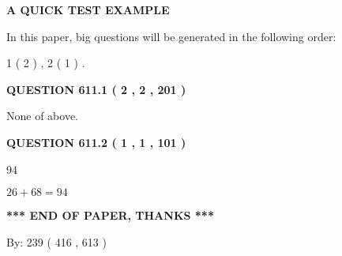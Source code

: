 \documentclass[12pt]{article}
\begin{document}
   
   
   
   
   
 \vspace{0.2in}
{\LARGE {\textbf{ A QUICK TEST EXAMPLE}}}
   
   
   
\vspace{0.2in}
   
In this paper, big questions will be generated in the following order: 
   
   
   1 ( 2 )
 ,
   2 ( 1 )
 .
  
\vspace{0.2in}
  
{\textbf{\Large{QUESTION
611.1 
 ( 2 , 2 , 201 )
}}}
  
  
 
 
\noindent{}
 
 
 None of above.
 
 
 
 
  
\vspace{0.2in}
  
{\textbf{\Large{QUESTION
611.2 
 ( 1 , 1 , 101 )
}}}
  
  
 
 
\noindent{}

94
 
 
 
 
\noindent{}

$ %
26 +  %
68=   %
94$
 
 
   
   
 \vspace{0.2in}
 
   
   
   
   
\vspace{1.0in} 
{\textbf{\large{ *** END OF PAPER, THANKS *** }}} 
   
   
\hspace{1.0in} By: 
 239 ( 416 ,  613 )
   
   
   
   
\newpage 
\setcounter{page}{ 
   612001 } 
   
   
   
\end{document}
